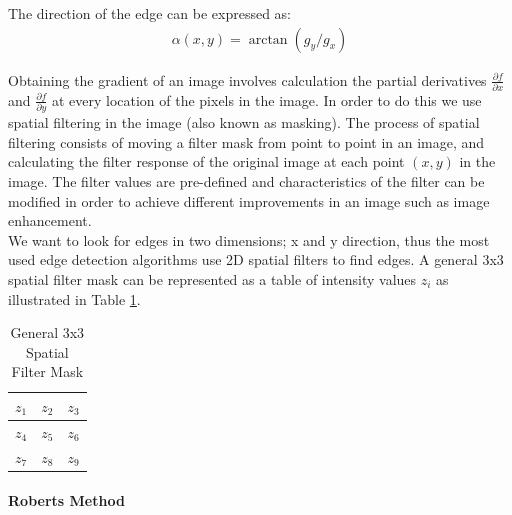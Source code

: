 The direction of the edge can be expressed as:
\begin{align}
\alpha(x,y) = \arctan(g_y/g_x)
\label{eq:direction}
\end{align}

Obtaining the gradient of an image involves calculation the partial derivatives $\frac{\partial f}{\partial x}$ and $\frac{\partial f}{\partial y}$ at every location of the pixels in the image. In order to do this we use spatial filtering in the image (also known as masking). The process of spatial filtering consists of moving a filter mask from point to point in an image, and calculating the filter response of the original image at each point $(x,y)$ in the image. The filter values are pre-defined and characteristics of the filter can be modified in order to achieve different improvements in an image such as image enhancement.\\

We want to look for edges in two dimensions; x and y direction, thus the most used edge detection algorithms use 2D spatial filters to find edges. A general 3x3 spatial filter mask can be represented as a table of intensity values $z_i$ as illustrated in Table \ref{spatial}.
\begin{table}[h]
\centering
\caption{General 3x3 Spatial Filter Mask}
\label{spatial}
\begin{tabular}{|l|l|l|}
\hline
$z_1$ & $z_2$ & $z_3$\\ \hline
$z_4$ & $z_5$ & $z_6$\\ \hline
$z_7$ & $z_8$ & $z_9$\\ \hline
\end{tabular}
\end{table}



\paragraph{Roberts Method}

